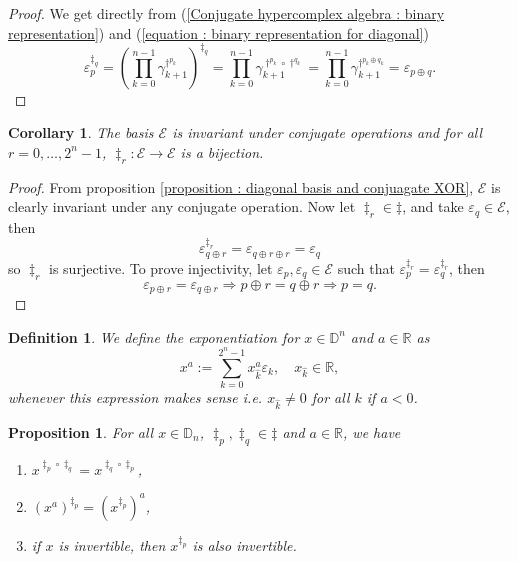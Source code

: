 \documentclass{article}
\newtheorem{corollary}[theorem]{Corollary}
\newtheorem{definition}[theorem]{Definition}
\newtheorem{proposition}[theorem]{Proposition}
\begin{document}
\begin{proof}
    We get directly from (\ref{Conjugate hypercomplex algebra : binary representation}) and (\ref{equation : binary representation for diagonal})
    $$ \varepsilon_p^{\ddagger_q} = \left( \prod_{k=0}^{n-1} \gamma_{k+1}^{\dagger^{p_k}} \right)^{\ddagger_q} = \prod_{k=0}^{n-1} \gamma_{k+1}^{\dagger^{p_k} \circ \dagger^{q_k}} = \prod_{k=0}^{n-1} \gamma_{k+1}^{\dagger^{p_k \oplus q_k}} = \varepsilon_{p \oplus q}. $$
\end{proof}
\begin{corollary}
    \label{corollary : diagonal basis invariant}
    The basis $\mathcal{E}$ is invariant under conjugate operations and for all $r=0,\ldots,2^{n}-1$, $\ddagger_r:\mathcal{E} \rightarrow \mathcal{E}$ is a bijection.
\end{corollary}
\begin{proof}
    From proposition \ref{proposition : diagonal basis and conjuagate XOR}, $\mathcal{E}$ is clearly invariant under any conjugate operation. Now let $\ddagger_r \in \ddagger$, and take $\varepsilon_q \in \mathcal{E}$, then
    $$ \varepsilon_{q \oplus r}^{\ddagger_r} = \varepsilon_{q \oplus r \oplus r} = \varepsilon_{q} $$
    so $\ddagger_r$ is surjective. To prove injectivity, let $\varepsilon_p, \varepsilon_q \in \mathcal{E}$ such that $\varepsilon_p^{\ddagger_r} = \varepsilon_q^{\ddagger_r}$, then
    $$ \varepsilon_{p \oplus r} = \varepsilon_{q \oplus r} \Rightarrow p \oplus r = q \oplus r \Rightarrow p = q. $$
\end{proof}
\begin{definition}
    \label{definition : exponentiation in multi-algebra}
    We define the exponentiation for $x \in \mathbb{D}^n$ and $a \in \mathbb{R}$ as
    $$ x^a := \sum_{k=0}^{2^n-1} x_{\hat k}^a \varepsilon_k, \quad x_{\hat{k}} \in \mathbb{R}, $$
    whenever this expression makes sense i.e. $x_{\hat{k}} \neq 0$ for all $k$ if $a < 0$.
\end{definition}
\begin{proposition}
    \label{proposition : basic properties conjugates}
    For all $x \in \mathbb{D}_n$, $\ddagger_p, \ddagger_q \in \ddagger$ and $a \in \mathbb{R}$, we have
    \begin{enumerate}
        \item $x^{\ddagger_p \circ \ddagger_q} = x^{\ddagger_q \circ \ddagger_p}$,
        \item $(x^{a})^{\ddagger_p} = (x^{\ddagger_p})^a$,
        \item if $x$ is invertible, then $x^{\ddagger_p}$ is also invertible.
    \end{enumerate}
\end{proposition}
\end{document}
